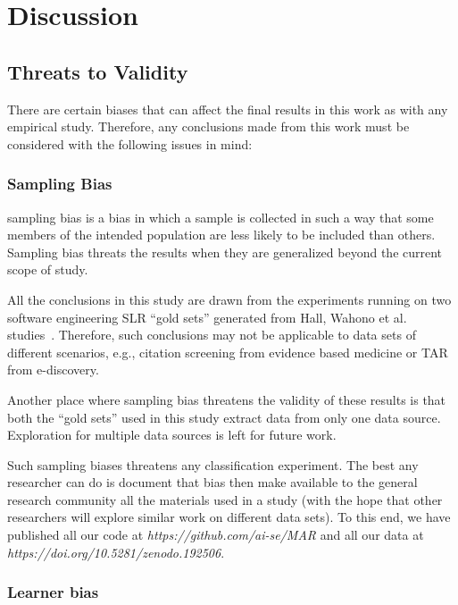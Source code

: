 \documentclass[final,twocolumn,5p]{elsarticle}
\theoremstyle{break}
\begin{document}
\section{Discussion}

\subsection{Threats to Validity}
\label{sect: Threats to Validity}

There are certain biases that can affect the final
results in this work as with any empirical study. Therefore, any conclusions made from this work must be considered with the following issues in mind:


\subsubsection{Sampling Bias}

sampling bias is a bias in which a sample is collected in such a way that some members of the intended population are less likely to be included than others. Sampling bias threats the results when they are generalized beyond the current scope of study.

All the conclusions in this study are drawn from the experiments running on two software engineering SLR ``gold sets'' generated from Hall, Wahono et al. studies~\cite{hall2012systematic,wahono2015systematic}. Therefore, such conclusions may not be applicable to data sets of different scenarios, e.g., citation screening from evidence based medicine or TAR from e-discovery.

Another place where sampling bias threatens the validity of these results is that both
the ``gold sets'' used in this study extract data from only one data source. Exploration for multiple data sources is left for future work. 

Such sampling biases threatens any classification experiment. The best any researcher can do is document that bias then make available to the general research community all the materials used in a study (with the hope that other researchers will explore similar work on different data sets). To this end, we have published all our code at \textit{https://github.com/ai-se/MAR} and all our data at \textit{https://doi.org/10.5281/zenodo.192506}.

\subsubsection{Learner bias}
\end{document}
